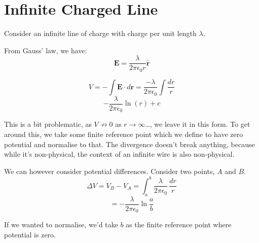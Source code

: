 \section{Infinite Charged Line}
Consider an infinite line of charge with charge per unit length $\lambda$.

From Gauss' law, we have:
\[
    \pmb{E} = \frac{\lambda}{2 \pi \epsilon_0 r} \hat{\pmb{r}}
\]

\[
    V = - \int \pmb{E} \cdot d \pmb{r} = \frac{-\lambda}{2 \pi \epsilon_0} \int \frac{dr}{r}
\]
\[
    - \frac{\lambda}{2 \pi \epsilon_0} \ln(r) + c
\]

This is a bit problematic, as $V \not\to 0$ as $r \to \infty$\dots, we leave it in this form. To get around this, we take some finite reference point which we define to have zero potential and normalise to that. The divergence doesn't break anything, because while it's non-physical, the context of an infinite wire is also non-physical.

We can however consider potential differences. Consider two points, $A$ and $B$.
\[
    \Delta V = V_B - V_A = \int_{a}^{b} \frac{\lambda}{2 \pi \epsilon_0} \, \frac{dr}{r}
\]
\[
    = - \frac{\lambda}{2 \pi \epsilon_0} \ln \frac{a}{b}
\]

If we wanted to normalise, we'd take $b$ as the finite reference point where potential is zero.
